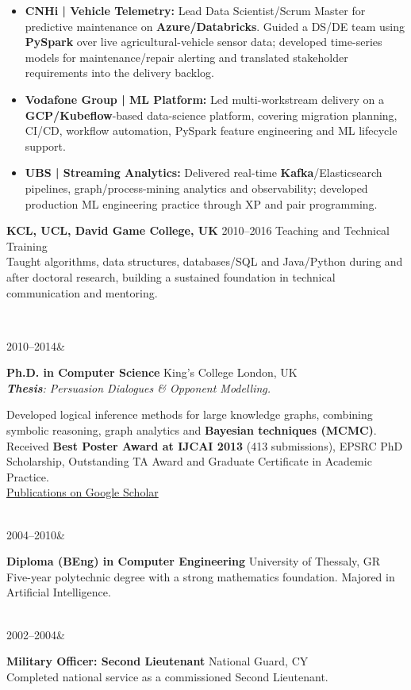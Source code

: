 \documentclass[]{../../../../friggeri-cv}
\renewcommand{\entry}[4]{%
  \parbox[t]{\dimexpr\textwidth-\entryleftinset\relax}{%
    \textbf{#2}%
    {\footnotesize\addfontfeature{Color=lightgray}\hspace{0.6em}#1}%
    \hfill%
    {\small\color{textcolor} #3}\\%
    #4\vspace{\parsep}%
  }\\}
\renewcommand{\entrytwo}[4]{%
  #1&\parbox[t]{14cm}{%
    \textbf{#2}%
    \hfill%
    {\small\color{textcolor} #3}\\%
    #4\vspace{\parsep}%
  }\\}
\begin{document}
\begin{entrylist}
{{        }
        \begin{itemize}[leftmargin=1.1em, itemsep=2pt, topsep=3pt, parsep=0pt]
            \item \small\textbf{CNHi | Vehicle Telemetry:} Lead Data Scientist/Scrum Master for predictive maintenance on \textbf{Azure/Databricks}. Guided a DS/DE team using \textbf{PySpark} over live agricultural-vehicle sensor data; developed time-series models for maintenance/repair alerting and translated stakeholder requirements into the delivery backlog.
            \item \small\textbf{Vodafone Group | ML Platform:} Led multi-workstream delivery on a \textbf{GCP/Kubeflow}-based data-science platform, covering migration planning, CI/CD, workflow automation, PySpark feature engineering and ML lifecycle support.
            \item \small\textbf{UBS | Streaming Analytics:} Delivered real-time \textbf{Kafka}/Elasticsearch pipelines, graph/process-mining analytics and observability; developed production ML engineering practice through XP and pair programming.
        \end{itemize}
    }
    \entry
    {2010--2016}
    {KCL, UCL, David Game College, UK}
    {Teaching and Technical Training}
    {\small Taught algorithms, data structures, databases/SQL and Java/Python during and after doctoral research, building a sustained foundation in technical communication and mentoring.}
\end{entrylist}
\newpage
\setlength{\parskip}{2pt}
\setlength{\parsep}{0pt}
\begin{entrylist2}
    \entrytwo
        {\small 2010--2014}
        {\small Ph.D. in Computer Science}
        {\small King's College London, UK}
        {\small \emph{\textbf{Thesis}: Persuasion Dialogues \& Opponent Modelling.}

        {\small Developed logical inference methods for large knowledge graphs, combining symbolic reasoning, graph analytics and \textbf{Bayesian techniques (MCMC)}. Received \textbf{Best Poster Award at IJCAI 2013} (413 submissions), EPSRC PhD Scholarship, Outstanding TA Award and Graduate Certificate in Academic Practice.
        \\ \href{https://scholar.google.com/citations?hl=en&user=Rr3KTx8AAAAJ}{Publications on Google Scholar}}
        }
    \entrytwo
        {\small 2004--2010}
        {\small Diploma (BEng) in Computer Engineering}
        {\small University of Thessaly, GR}
        {\small Five-year polytechnic degree with a strong mathematics foundation. Majored in Artificial Intelligence.}
    \entrytwo
        {\small 2002--2004}
        {\small Military Officer: Second Lieutenant}
        {\small National Guard, CY}
        {\small Completed national service as a commissioned Second Lieutenant.}
\end{entrylist2}
\end{document}
